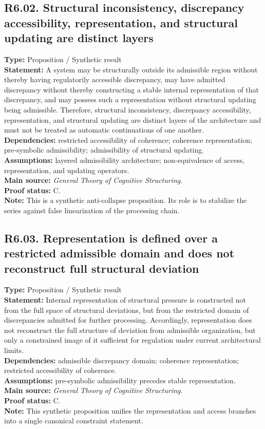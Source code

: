 \documentclass[12pt]{article}
\begin{document}
	\subsection*{R6.02. Structural inconsistency, discrepancy accessibility, representation, and structural updating are distinct layers}
	\textbf{Type:} Proposition / Synthetic result \\
	\textbf{Statement:} A system may be structurally outside its admissible region without thereby
	having regulatorily accessible discrepancy, may have admitted discrepancy without thereby
	constructing a stable internal representation of that discrepancy, and may possess such a
	representation without structural updating being admissible. Therefore, structural
	inconsistency, discrepancy accessibility, representation, and structural updating are distinct
	layers of the architecture and must not be treated as automatic continuations of one another. \\
	\textbf{Dependencies:} restricted accessibility of coherence; coherence representation;
	pre-symbolic admissibility; admissibility of structural updating. \\
	\textbf{Assumptions:} layered admissibility architecture; non-equivalence of access, representation,
	and updating operators. \\
	\textbf{Main source:} \emph{General Theory of Cognitive Structuring}. \\
	\textbf{Proof status:} C. \\
	\textbf{Note:} This is a synthetic anti-collapse proposition. Its role is to stabilize the
	series against false linearization of the processing chain.
	
	\subsection*{R6.03. Representation is defined over a restricted admissible domain and does not reconstruct full structural deviation}
	\textbf{Type:} Proposition / Synthetic result \\
	\textbf{Statement:} Internal representation of structural pressure is constructed not from the
	full space of structural deviations, but from the restricted domain of discrepancies admitted
	for further processing. Accordingly, representation does not reconstruct the full structure of
	deviation from admissible organization, but only a constrained image of it sufficient for
	regulation under current architectural limits. \\
	\textbf{Dependencies:} admissible discrepancy domain; coherence representation; restricted
	accessibility of coherence. \\
	\textbf{Assumptions:} pre-symbolic admissibility precedes stable representation. \\
	\textbf{Main source:} \emph{General Theory of Cognitive Structuring}. \\
	\textbf{Proof status:} C. \\
	\textbf{Note:} This synthetic proposition unifies the representation and access branches into a
	single canonical constraint statement.
	
\end{document}
